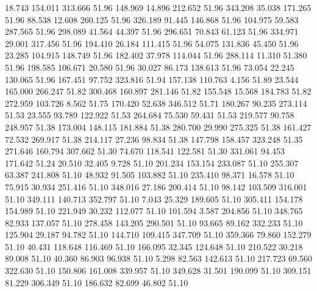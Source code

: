   18.743  154.011  313.666        51.96
 148.969   14.896  212.652        51.96
 343.208   35.038  171.265        51.96
  88.538   12.608  260.125        51.96
 326.189   91.445  146.868        51.96
 104.975   59.583  287.565        51.96
 298.089   41.564   44.397        51.96
 296.651   70.843   61.123        51.96
 334.971   29.001  317.456        51.96
 194.410   26.184  111.415        51.96
  54.075  131.836   45.450        51.96
  23.285  104.915  148.749        51.96
 182.402   37.978  114.044        51.96
 288.114   11.310   51.380        51.96
 198.585  106.671   20.580        51.96
  30.027   86.173  138.613        51.96
  73.054   22.245  130.065        51.96
 167.451   97.752  323.816        51.94
 157.138  110.763    4.156        51.89
  23.544  165.000  266.247        51.82
 300.468  160.897  281.146        51.82
 155.548   15.568  184.783        51.82
 272.959  103.726    8.562        51.75
 170.420   52.638  346.512        51.71
 180.267   90.235  273.114        51.53
  23.555   93.789  122.922        51.53
 264.684   75.530   59.431        51.53
 219.577   90.758  248.957        51.38
 173.004  148.115  181.884        51.38
 280.700   29.990  275.325        51.38
 161.427   72.532  269.917        51.38
 214.117   27.236   98.834        51.38
 147.798  158.457  323.248        51.35
 271.646  160.794  307.662        51.30
  74.670  118.541  122.581        51.30
 331.061   94.453  171.642        51.24
  20.510   32.405    9.728        51.10
 201.234  153.154  233.087        51.10
 255.307   63.387  241.808        51.10
  48.932   91.505  103.882        51.10
 235.410   98.371   16.578        51.10
  75.915   30.934  251.416        51.10
 348.016   27.186  200.414        51.10
  98.142  103.509  316.001        51.10
 349.111  140.713  352.797        51.10
   7.043   25.329  189.605        51.10
 305.411  154.178  154.989        51.10
 221.949   30.232  112.077        51.10
 101.594    3.587  204.856        51.10
 348.765   82.933  137.057        51.10
 278.458  143.205  290.501        51.10
  93.665   89.162  332.233        51.10
 125.904   29.187   94.782        51.10
 144.710  109.415  347.709        51.10
 359.366   79.860  152.279        51.10
  40.431  118.648  116.469        51.10
 166.095   32.345  124.648        51.10
 210.522   30.218   89.008        51.10
  40.360   86.903   96.938        51.10
   5.298   82.563  142.613        51.10
 217.723   69.560  322.630        51.10
 150.806  161.008  339.957        51.10
 349.628   31.501  190.099        51.10
 309.151   81.229  306.349        51.10
 186.632   82.699   46.802        51.10
